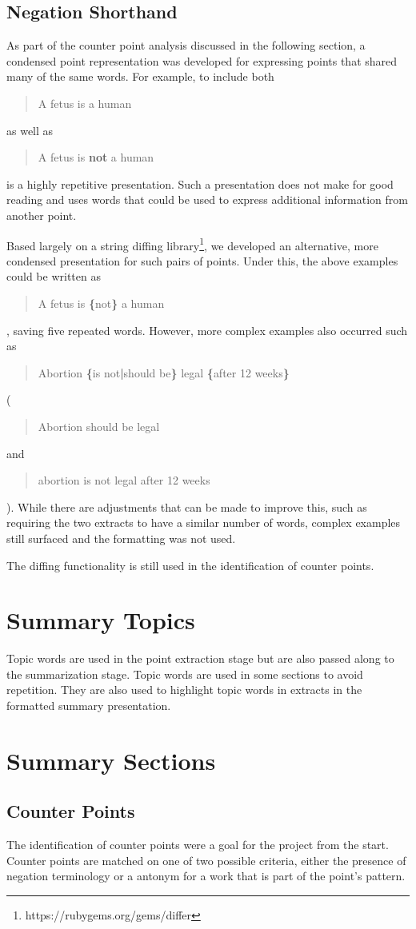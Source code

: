     \tocless\subsection{Negation Shorthand}
      As part of the counter point analysis discussed in the following section, a condensed point representation was developed for expressing points that shared many of the same words. For example, to include both \blockquote{A fetus is a human} as well as \blockquote{A fetus is \textbf{not} a human} is a highly repetitive presentation. Such a presentation does not make for good reading and uses words that could be used to express additional information from another point.

      Based largely on a string diffing library\footnote{https://rubygems.org/gems/differ}, we developed an alternative, more condensed presentation for such pairs of points. Under this, the above examples could be written as \blockquote{A fetus is \textbf{\{}not\textbf{\}} a human}, saving five repeated words. However, more complex examples also occurred such as \blockquote{Abortion \textbf{\{}is not\textbf{|}should be\textbf{\}} legal \textbf{\{}after 12 weeks\textbf{\}}} (\blockquote{Abortion should be legal} and \blockquote{abortion is not legal after 12 weeks}). While there are adjustments that can be made to improve this, such as requiring the two extracts to have a similar number of words, complex examples still surfaced and the formatting was not used.

      The diffing functionality is still used in the identification of counter points.

  \section{Summary Topics}
    Topic words are used in the point extraction stage but are also passed along to the summarization stage. Topic words are used in some sections to avoid repetition. They are also used to highlight topic words in extracts in the formatted summary presentation.

  \section{Summary Sections}
    \subsection{Counter Points}
      The identification of counter points were a goal for the project from the start. Counter points are matched on one of two possible criteria, either the presence of negation terminology or a antonym for a work that is part of the point's pattern.

